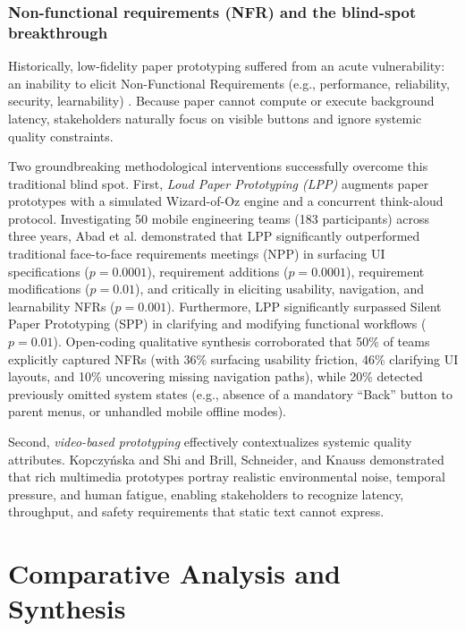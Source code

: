 \documentclass[conference]{IEEEtran}
\begin{document}
\subsubsection{Non-functional requirements (NFR) and the blind-spot breakthrough}
Historically, low-fidelity paper prototyping suffered from an acute vulnerability: an inability to elicit Non-Functional Requirements (e.g., performance, reliability, security, learnability) \cite{rueda2020requirements, davis2018maturity}. Because paper cannot compute or execute background latency, stakeholders naturally focus on visible buttons and ignore systemic quality constraints.

Two groundbreaking methodological interventions successfully overcome this traditional blind spot. First, \textit{Loud Paper Prototyping (LPP)} augments paper prototypes with a simulated Wizard-of-Oz engine and a concurrent think-aloud protocol. Investigating 50 mobile engineering teams (183 participants) across three years, Abad et al. \cite{abad2018loud} demonstrated that LPP significantly outperformed traditional face-to-face requirements meetings (NPP) in surfacing UI specifications ($p = 0.0001$), requirement additions ($p = 0.0001$), requirement modifications ($p = 0.01$), and critically in eliciting usability, navigation, and learnability NFRs ($p = 0.001$). Furthermore, LPP significantly surpassed Silent Paper Prototyping (SPP) in clarifying and modifying functional workflows ($p = 0.01$). Open-coding qualitative synthesis corroborated that 50\% of teams explicitly captured NFRs (with 36\% surfacing usability friction, 46\% clarifying UI layouts, and 10\% uncovering missing navigation paths), while 20\% detected previously omitted system states (e.g., absence of a mandatory ``Back'' button to parent menus, or unhandled mobile offline modes).

Second, \textit{video-based prototyping} effectively contextualizes systemic quality attributes. Kopczy{\'n}ska and Shi \cite{bano2023videos} and Brill, Schneider, and Knauss \cite{brill2010videos} demonstrated that rich multimedia prototypes portray realistic environmental noise, temporal pressure, and human fatigue, enabling stakeholders to recognize latency, throughput, and safety requirements that static text cannot express.

\section{Comparative Analysis and Synthesis}
\label{sec:comparative}
\end{document}
